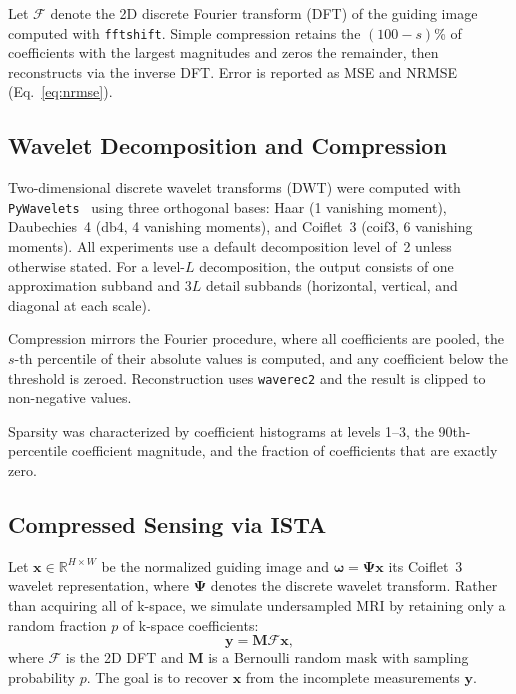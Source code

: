 \documentclass[10pt]{article}
\begin{document}
Let $\mathcal{F}$ denote the 2D discrete Fourier transform (DFT) of the
guiding image computed with \texttt{fftshift}.  Simple compression retains
the $(100-s)$\% of coefficients with the largest magnitudes and zeros the
remainder, then reconstructs via the inverse DFT.  Error is reported as MSE
and NRMSE (Eq.~\ref{eq:nrmse}).

\subsection{Wavelet Decomposition and Compression}
\label{sec:wavelet_meth}

Two-dimensional discrete wavelet transforms (DWT) were computed with
\texttt{PyWavelets}~\cite{lee2019pywavelets} using three orthogonal bases:
Haar (1 vanishing moment), Daubechies~4 (db4, 4 vanishing moments), and
Coiflet~3 (coif3, 6 vanishing moments).  All experiments use a default
decomposition level of~2 unless otherwise stated.  For a level-$L$
decomposition, the output consists of one approximation subband and $3L$ detail subbands (horizontal, vertical, and
diagonal at each scale).

Compression mirrors the Fourier procedure, where all coefficients are pooled, the
$s$-th percentile of their absolute values is computed, and any coefficient
below the threshold is zeroed.  Reconstruction uses \texttt{waverec2} and
the result is clipped to non-negative values.

Sparsity was characterized by coefficient histograms at levels 1--3, the
90th-percentile coefficient magnitude, and the fraction of coefficients that
are exactly zero.

\subsection{Compressed Sensing via ISTA}
\label{sec:ista_meth}

Let $\mathbf{x} \in \mathbb{R}^{H\times W}$ be the normalized guiding image
and $\boldsymbol{\omega} = \boldsymbol{\Psi}\mathbf{x}$ its Coiflet~3
wavelet representation, where $\boldsymbol{\Psi}$ denotes the discrete wavelet transform.
Rather than acquiring all of k-space, we simulate undersampled MRI by retaining
only a random fraction $p$ of k-space coefficients:
\begin{equation}
  \mathbf{y} = \mathbf{M}\mathcal{F}\mathbf{x},
  \label{eq:meas}
\end{equation}
where $\mathcal{F}$ is the 2D DFT and $\mathbf{M}$ is a Bernoulli random mask
with sampling probability $p$. The goal is to recover $\mathbf{x}$ from the
incomplete measurements $\mathbf{y}$.
\end{document}
